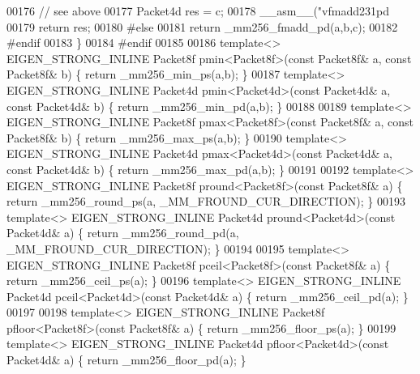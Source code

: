 \begin{DoxyCode}
{00176   \textcolor{comment}{// see above}
00177   Packet4d res = c;
00178   \_\_asm\_\_(\textcolor{stringliteral}{"vfmadd231pd %
00179   \textcolor{keywordflow}{return} res;
00180 \textcolor{preprocessor}{#else}
00181   \textcolor{keywordflow}{return} \_mm256\_fmadd\_pd(a,b,c);
00182 \textcolor{preprocessor}{#endif}
00183 \}
00184 \textcolor{preprocessor}{#endif}
00185 
00186 \textcolor{keyword}{template}<> EIGEN\_STRONG\_INLINE Packet8f pmin<Packet8f>(\textcolor{keyword}{const} Packet8f& a, \textcolor{keyword}{const} Packet8f& b) \{ \textcolor{keywordflow}{return} 
      \_mm256\_min\_ps(a,b); \}
00187 \textcolor{keyword}{template}<> EIGEN\_STRONG\_INLINE Packet4d pmin<Packet4d>(\textcolor{keyword}{const} Packet4d& a, \textcolor{keyword}{const} Packet4d& b) \{ \textcolor{keywordflow}{return} 
      \_mm256\_min\_pd(a,b); \}
00188 
00189 \textcolor{keyword}{template}<> EIGEN\_STRONG\_INLINE Packet8f pmax<Packet8f>(\textcolor{keyword}{const} Packet8f& a, \textcolor{keyword}{const} Packet8f& b) \{ \textcolor{keywordflow}{return} 
      \_mm256\_max\_ps(a,b); \}
00190 \textcolor{keyword}{template}<> EIGEN\_STRONG\_INLINE Packet4d pmax<Packet4d>(\textcolor{keyword}{const} Packet4d& a, \textcolor{keyword}{const} Packet4d& b) \{ \textcolor{keywordflow}{return} 
      \_mm256\_max\_pd(a,b); \}
00191 
00192 \textcolor{keyword}{template}<> EIGEN\_STRONG\_INLINE Packet8f pround<Packet8f>(\textcolor{keyword}{const} Packet8f& a) \{ \textcolor{keywordflow}{return} \_mm256\_round\_ps(a, 
      \_MM\_FROUND\_CUR\_DIRECTION); \}
00193 \textcolor{keyword}{template}<> EIGEN\_STRONG\_INLINE Packet4d pround<Packet4d>(\textcolor{keyword}{const} Packet4d& a) \{ \textcolor{keywordflow}{return} \_mm256\_round\_pd(a, 
      \_MM\_FROUND\_CUR\_DIRECTION); \}
00194 
00195 \textcolor{keyword}{template}<> EIGEN\_STRONG\_INLINE Packet8f pceil<Packet8f>(\textcolor{keyword}{const} Packet8f& a) \{ \textcolor{keywordflow}{return} \_mm256\_ceil\_ps(a); \}
00196 \textcolor{keyword}{template}<> EIGEN\_STRONG\_INLINE Packet4d pceil<Packet4d>(\textcolor{keyword}{const} Packet4d& a) \{ \textcolor{keywordflow}{return} \_mm256\_ceil\_pd(a); \}
00197 
00198 \textcolor{keyword}{template}<> EIGEN\_STRONG\_INLINE Packet8f pfloor<Packet8f>(\textcolor{keyword}{const} Packet8f& a) \{ \textcolor{keywordflow}{return} \_mm256\_floor\_ps(a); \}
00199 \textcolor{keyword}{template}<> EIGEN\_STRONG\_INLINE Packet4d pfloor<Packet4d>(\textcolor{keyword}{const} Packet4d& a) \{ \textcolor{keywordflow}{return} \_mm256\_floor\_pd(a); \}
}}
\end{DoxyCode}
